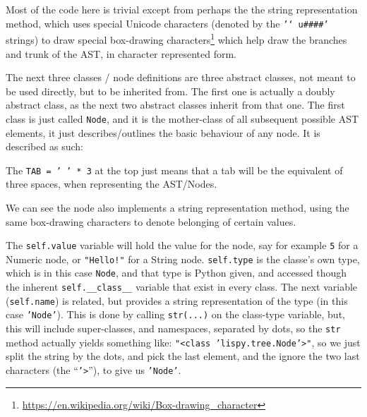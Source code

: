 \documentclass{article}
\newcommand{\code}[1]{\texttt{#1}}
\begin{document}
      \graph{ast_Tree}{Defined at the top of \code{/lispy/tree.py}}

      Most of the code here is trivial except from perhaps the the string
      representation method, which uses special Unicode characters (denoted by
      the \code{'\char`\\u\#\#\#\#'} strings) to draw special box-drawing
      characters\footnote{\url{https://en.wikipedia.org/wiki/Box-drawing_character}}
      which help draw the branches and trunk of the AST, in character
      represented form.

      \clearpage

      The next three classes / node definitions are three abstract classes,
      not meant to be used directly, but to be inherited from.
      The first one is actually a doubly abstract class, as the next two
      abstract classes inherit from that one.  The first class is just called
      \code{Node}, and it is the mother-class of all subsequent possible
      AST elements, it just describes/outlines the basic behaviour of any node.
      It is described as such:


      The \code{TAB = ' ' * 3} at the top just means that a tab will be the
      equivalent of three spaces, when representing the AST/Nodes.

      We can see the node also implements a string representation method, using
      the same box-drawing characters to denote belonging of certain values.

      The \code{self.value} variable will hold the value for the node, say for
      example \code{5} for a Numeric node, or \code{"Hello!"} for a String node.
      \code{self.type} is the classe's own type, which is in this case \code{Node}, and
      that type is Python given, and accessed though the inherent \code{self.\_\_class\_\_}
      variable that exist in every class. The next variable (\code{self.name})
      is related, but provides a string representation of the type (in this
      case \code{'Node'}). This is done by calling \code{str(...)} on the class-type
      variable, but, this will include super-classes, and namespaces, separated
      by dots, so the \code{str} method actually yields something like:
      \code{"<class 'lispy.tree.Node'>"}, so we just split the string by the dots, and
      pick the last element, and the ignore the two last characters
      (the ``\code{'>}''), to give us \code{'Node'}.
\end{document}
